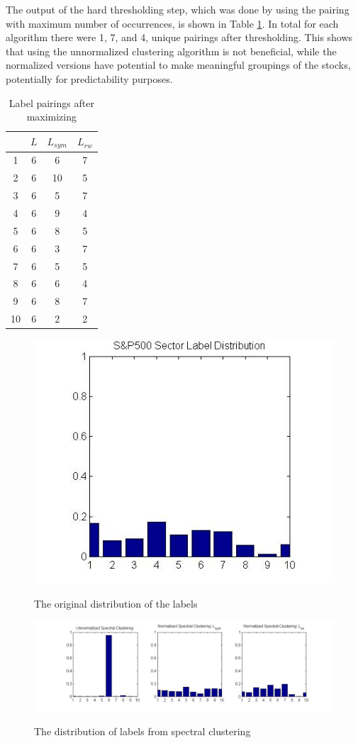 \documentclass[conference]{IEEEtran}
\begin{document}
The output of the hard thresholding step, which was done by using the pairing with maximum number of occurrences, is shown in Table \ref{tab:maxpair}. In total for each algorithm there were 1, 7, and 4, unique pairings after thresholding. This shows that using the unnormalized clustering algorithm is not beneficial, while the normalized versions have potential to make meaningful groupings of the stocks, potentially for predictability purposes.

\begin{table}[h]
\renewcommand{\arraystretch}{1.2}
\caption{Label pairings after maximizing} \label{tab:maxpair}
\centering
\begin{tabular}{c||ccc}
& $L$ & $L_{sym}$ & $L_{rw}$ \\
\hline \hline
1 & 6 & 6 & 7 \\ 
2 & 6 & 10 & 5 \\ 
3 & 6 & 5 & 7\\ 
4 & 6 & 9 & 4 \\ 
5 & 6 & 8 & 5 \\ 
6 & 6 & 3 & 7 \\ 
7 & 6 & 5 & 5\\ 
8 & 6 & 6 & 4\\ 
9 & 6 & 8 & 7\\ 
10 & 6 & 2 & 2 
\end{tabular}
\end{table}



\begin{figure}[H] 
\begin{center}
  \noindent
  \includegraphics[width=.4\columnwidth]{original_distro}
  \caption{The original distribution of the labels}  \label{fig:original}
\noindent
  \includegraphics[width=\columnwidth]{distros} 
  \caption{The distribution of labels from spectral clustering} \label{fig:distro}
\end{center}
\end{figure}
\end{document}
